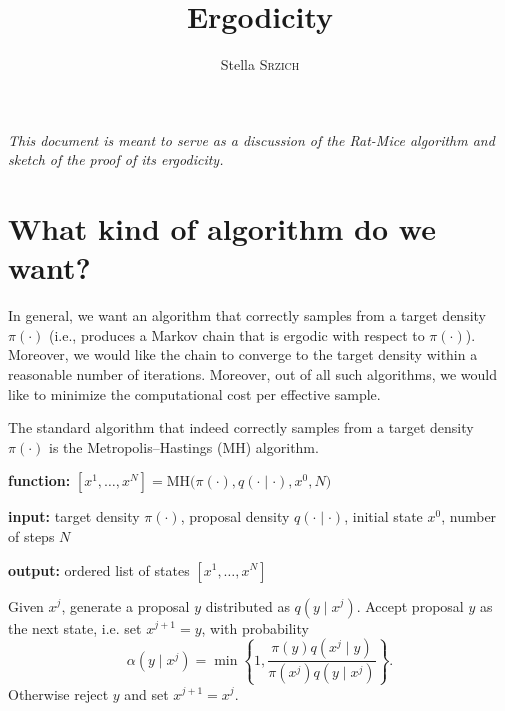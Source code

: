 \documentclass[12pt]{article}
\title{Ergodicity}
\author{Stella \textsc{Srzich}}
\theoremstyle{definition}
\theoremstyle{remark}
\theoremstyle{plain}
\begin{document}
\maketitle


\textit{This document is meant to serve as a 
discussion of the Rat-Mice algorithm and sketch of the proof of its ergodicity.}


\section{What kind of algorithm do we want?}

In general, we want an algorithm that 
correctly samples from a target density $\pi(\cdot)$ 
(i.e., produces a Markov chain that is ergodic with respect to $\pi(\cdot)$). 
Moreover, we would like the chain to converge to the target density within a reasonable number of iterations. 
Moreover, out of all such algorithms, we would like to minimize the computational cost per effective sample.

The standard algorithm that indeed correctly samples 
from a target density $\pi(\cdot)$ is the Metropolis--Hastings (MH) algorithm.

\begin{algorithm}[H]
  \caption{Metropolis--Hastings (MH)}
  \label{alg:mh}

  \textbf{function:} $[x^1,\ldots,x^N] =
  \mathrm{MH}\bigl(\pi(\cdot), q(\cdot\mid\cdot), x^0, N\bigr)$

  \textbf{input:} target density $\pi(\cdot)$, proposal density
  $q(\cdot\mid\cdot)$, initial state $x^0$, number of steps $N$

  \textbf{output:} ordered list of states $[x^1,\ldots,x^N]$

  \begin{algorithmic}[1]
      \State Given $x^j$, generate a proposal $y$ distributed as $q(y \mid x^j)$.
      \State Accept proposal $y$ as the next state, i.e. set $x^{j+1} = y$, with probability
      \[
          \alpha(y \mid x^j)
          =
          \min\left\{
              1,
              \frac{\pi(y)q(x^j\mid y)}
                   {\pi(x^j)q(y\mid x^j)}
          \right\}.
      \]
      \State Otherwise reject $y$ and set $x^{j+1} = x^j$.
  \EndFor
  \end{algorithmic}
\end{algorithm}
\end{document}
